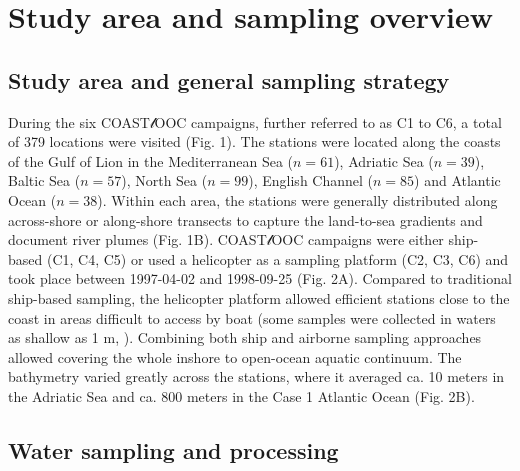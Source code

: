 \documentclass[essd, manuscript]{copernicus}
\begin{document}
\section{Study area and sampling overview}

\subsection{Study area and general sampling strategy}

During the six COAST$\mathscr{l}$OOC campaigns, further referred to as C1 to C6, a total of 379 locations were visited (Fig. 1). The stations were located along the coasts of the Gulf of Lion in the Mediterranean Sea ($n = 61$), Adriatic Sea ($n = 39$), Baltic Sea ($n = 57$), North Sea ($n = 99$), English Channel ($n = 85$) and Atlantic Ocean ($n = 38$). Within each area, the stations were generally distributed along across-shore or along-shore transects to capture the land-to-sea gradients and document river plumes (Fig. 1B). COAST$\mathscr{l}$OOC campaigns were either ship-based (C1, C4, C5) or used a helicopter as a sampling platform (C2, C3, C6) and took place between 1997-04-02 and 1998-09-25 (Fig. 2A). Compared to traditional ship-based sampling, the helicopter platform allowed efficient stations close to the coast in areas difficult to access by boat (some samples were collected in waters as shallow as 1 m, \citealt{Babin2003b}). Combining both ship and airborne sampling approaches allowed covering the whole inshore to open-ocean aquatic continuum. The bathymetry \citep{GEBCO2021} varied greatly across the stations, where it averaged ca. 10 meters in the Adriatic Sea and ca. 800 meters in the Case 1 Atlantic Ocean (Fig. 2B).

\subsection{Water sampling and processing}
\end{document}
